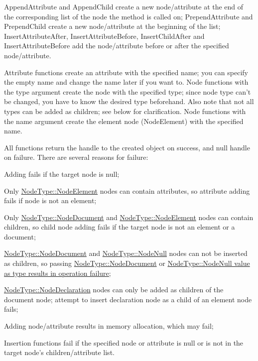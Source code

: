  AppendAttribute and AppendChild create a new node/attribute at the end of the corresponding list of the node the method is called on; PrependAttribute and PrependChild create a new node/attribute at the beginning of the list; InsertAttributeAfter, InsertAttributeBefore, InsertChildAfter and InsertAttributeBefore add the node/attribute before or after the specified node/attribute. \par
 \par
 Attribute functions create an attribute with the specified name; you can specify the empty name and change the name later if you want to. Node functions with the type argument create the node with the specified type; since node type can't be changed, you have to know the desired type beforehand. Also note that not all types can be added as children; see below for clarification. Node functions with the name argument create the element node (NodeElement) with the specified name. \par
 \par
 All functions return the handle to the created object on success, and null handle on failure. There are several reasons for failure:
\begin{DoxyItemize}
\item Adding fails if the target node is null;
\item Only \hyperlink{namespacephys_1_1xml_a668b0cc666a9d49f7c7222a7552115d3}{NodeType::NodeElement} nodes can contain attributes, so attribute adding fails if node is not an element;
\item Only \hyperlink{namespacephys_1_1xml_a668b0cc666a9d49f7c7222a7552115d3}{NodeType::NodeDocument} and \hyperlink{namespacephys_1_1xml_a668b0cc666a9d49f7c7222a7552115d3}{NodeType::NodeElement} nodes can contain children, so child node adding fails if the target node is not an element or a document;
\item \hyperlink{namespacephys_1_1xml_a668b0cc666a9d49f7c7222a7552115d3}{NodeType::NodeDocument} and \hyperlink{namespacephys_1_1xml_a668b0cc666a9d49f7c7222a7552115d3}{NodeType::NodeNull} nodes can not be inserted as children, so passing \hyperlink{namespacephys_1_1xml_a668b0cc666a9d49f7c7222a7552115d3}{NodeType::NodeDocument} or \hyperlink{namespacephys_1_1xml_a668b0cc666a9d49f7c7222a7552115d3}{NodeType::NodeNull value as type results in operation failure;}
\item \hyperlink{namespacephys_1_1xml_a668b0cc666a9d49f7c7222a7552115d3}{NodeType::NodeDeclaration} nodes can only be added as children of the document node; attempt to insert declaration node as a child of an element node fails;
\item Adding node/attribute results in memory allocation, which may fail;
\item Insertion functions fail if the specified node or attribute is null or is not in the target node's children/attribute list.
\end{DoxyItemize}

